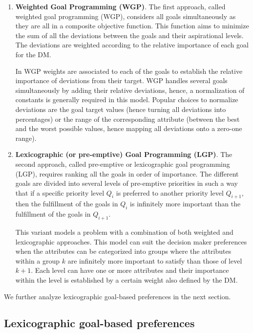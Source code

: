 \begin{enumerate}

    \item \textbf{Weighted Goal Programming (WGP)}.
The first approach, called weighted goal programming (WGP), considers all goals simultaneously as they are all in a composite objective function. This function aims to minimize the sum of all the deviations between the goals and their aspirational levels. The deviations are weighted according to the relative importance of each goal for the DM.

In WGP weights are associated to each of the goals to establish the relative importance of deviations from their target. WGP handles several goals simultaneously by adding their relative deviations, hence, a normalization of constants is generally required in this model. Popular choices to normalize deviations are the goal target values (hence turning all deviations into percentages) or the range of the corresponding attribute (between the best and the worst possible values, hence mapping all deviations onto a zero-one range).

    \item \textbf{Lexicographic (or pre-emptive) Goal Programming (LGP)}.
The second approach, called pre-emptive or lexicographic goal programming (LGP), requires ranking all the goals in order of importance. The different goals are divided into several levels of pre-emptive priorities in such a way that if a specific priority level $Q_i$ is preferred to another priority level $Q_{i+1}$, then the fulfillment of the goals in $Q_i$ is infinitely more important than the fulfillment of the goals in $Q_{i+1}$. 

This variant models a problem with a combination of both weighted and lexicographic approaches. This model can suit the decision maker preferences when the attributes can be categorized into groups where the attributes within a group $k$ are infinitely more important to satisfy than those of level $k+1$. Each level can have one or more attributes and their importance within the level is established by a certain weight also defined by the DM. 
\end{enumerate}

We further analyze lexicographic goal-based preferences in the next section.

\subsection{Lexicographic goal-based preferences}
\label{chapMultiObjAlg:subsec:lex-MOP}

